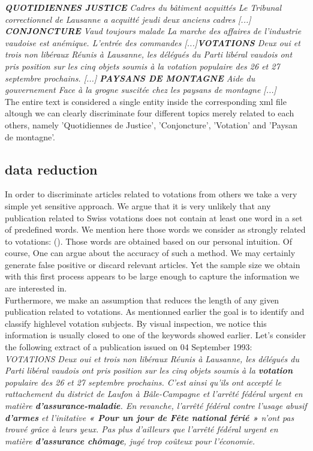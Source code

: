 \documentclass[11pt]{article}
\begin{document}
\textit{\textbf{QUOTIDIENNES JUSTICE} Cadres du bâtiment acquittés Le Tribunal correctionnel de Lausanne a acquitté jeudi deux anciens cadres [...] \textbf{CONJONCTURE} Vaud toujours malade La marche des affaires de l'industrie vaudoise est anémique. L'entrée des commandes [...]\textbf{VOTATIONS} Deux oui et trois non libéraux Réunis à Lausanne, les délégués du Parti libéral vaudois ont pris position sur les cinq objets soumis à la votation populaire des 26 et 27 septembre prochains. [...] \textbf{PAYSANS DE MONTAGNE} Aide du gouvernement Face à la grogne suscitée chez les paysans de montagne [...]}\\
The entire text is considered a single entity inside the corresponding xml file altough we can clearly discriminate four different topics merely related to each others, namely 'Quotidiennes de Justice', 'Conjoncture', 'Votation' and 'Paysan de montagne'.   

\subsection{data reduction}

In order to discriminate articles related to votations from others we take a very simple yet sensitive approach. We argue that it is very unlikely that any publication related to Swiss votations does not contain at least one word in a set of predefined words. We mention here those words we consider as strongly related to votations: (). Those words are obtained based on our personal intuition. Of course, One can argue about the accuracy of such a method. We may certainly generate false positive or discard relevant articles. Yet the sample size we obtain with this first process appears to be large enough to capture the information we are interested in.
\\
Furthermore, we make an assumption that reduces the length of any given publication related to votations. As mentionned earlier the goal is to identify and classify highlevel votation subjects. By visual inspection, we notice this information is usually closed to one of the keywords showed earlier. 
Let's consider the following extract of a publication issued on 04 September 1993:\\
\textit{VOTATIONS Deux oui et trois non libéraux Réunis à Lausanne, les délégués du Parti libéral vaudois ont pris position sur les cinq objets soumis à la \textbf{votation} populaire des 26 et 27 septembre prochains. C'est ainsi qu'ils ont accepté le rattachement du district de Laufon à Bâle-Campagne et l'arrêté fédéral urgent en matière \textbf{d'assurance-maladie}. En revanche, l'arrêté fédéral contre l'usage abusif \textbf{d'armes} et l'initative \textbf{« Pour un jour de Fête national férié »} n'ont pas trouvé grâce à leurs yeux. Pas plus d'ailleurs que l'arrêté fédéral urgent en matière \textbf{d'assurance chômage}, jugé trop coûteux pour l'économie.}\\
\end{document}
